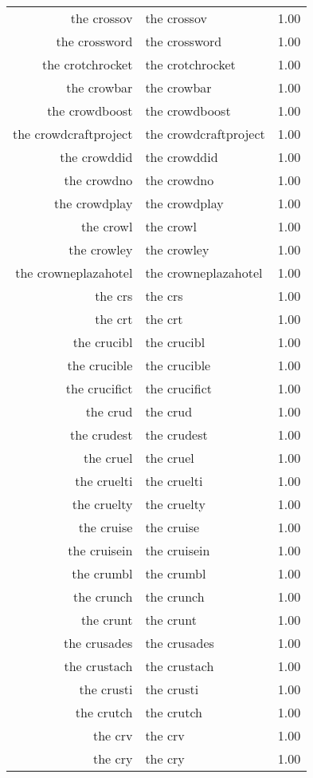 \begin{table}[ht]
\begin{tabular}{rlr}
  the crossov & the crossov & 1.00 \\ 
  the crossword & the crossword & 1.00 \\ 
  the crotchrocket & the crotchrocket & 1.00 \\ 
  the crowbar & the crowbar & 1.00 \\ 
  the crowdboost & the crowdboost & 1.00 \\ 
  the crowdcraftproject & the crowdcraftproject & 1.00 \\ 
  the crowddid & the crowddid & 1.00 \\ 
  the crowdno & the crowdno & 1.00 \\ 
  the crowdplay & the crowdplay & 1.00 \\ 
  the crowl & the crowl & 1.00 \\ 
  the crowley & the crowley & 1.00 \\ 
  the crowneplazahotel & the crowneplazahotel & 1.00 \\ 
  the crs & the crs & 1.00 \\ 
  the crt & the crt & 1.00 \\ 
  the crucibl & the crucibl & 1.00 \\ 
  the crucible & the crucible & 1.00 \\ 
  the crucifict & the crucifict & 1.00 \\ 
  the crud & the crud & 1.00 \\ 
  the crudest & the crudest & 1.00 \\ 
  the cruel & the cruel & 1.00 \\ 
  the cruelti & the cruelti & 1.00 \\ 
  the cruelty & the cruelty & 1.00 \\ 
  the cruise & the cruise & 1.00 \\ 
  the cruisein & the cruisein & 1.00 \\ 
  the crumbl & the crumbl & 1.00 \\ 
  the crunch & the crunch & 1.00 \\ 
  the crunt & the crunt & 1.00 \\ 
  the crusades & the crusades & 1.00 \\ 
  the crustach & the crustach & 1.00 \\ 
  the crusti & the crusti & 1.00 \\ 
  the crutch & the crutch & 1.00 \\ 
  the crv & the crv & 1.00 \\ 
  the cry & the cry & 1.00 \\ 

\end{tabular}
\end{table}

